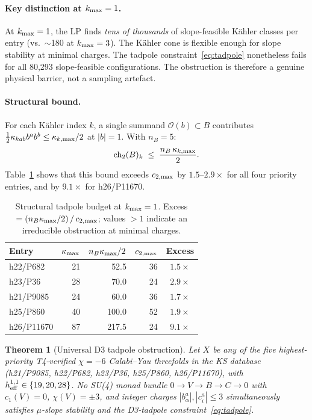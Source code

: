 \documentclass[11pt,a4paper]{article}
\newtheorem{theorem}{Theorem}
\newcommand{\cO}{\mathcal{O}}
\newcommand{\ch}{\mathrm{ch}}
\begin{document}
\paragraph{Key distinction at $k_{\rm max}=1$.}
At $k_{\rm max}=1$, the LP finds \emph{tens of thousands} of
slope-feasible Kähler classes per entry (vs.\ $\sim$180 at $k_{\rm max}=3$).
The Kähler cone is flexible enough for slope stability at minimal charges.
The tadpole constraint~\eqref{eq:tadpole} nonetheless fails for all
80,293 slope-feasible configurations.  The obstruction is therefore
a genuine physical barrier, not a sampling artefact.

\paragraph{Structural bound.}
For each K\"ahler index $k$, a single summand $\cO(b)\subset B$
contributes $\tfrac{1}{2}\kappa_{kab}b^a b^b \leq \kappa_{k,\rm max}/2$
at $|b|=1$.  With $n_B=5$:
\begin{equation}
  \ch_2(B)_k \;\leq\; \frac{n_B\,\kappa_{k,\rm max}}{2}.
  \label{eq:ch2_bound}
\end{equation}
Table~\ref{tab:tadpole_margin} shows that this bound exceeds
$c_{2,\rm max}$ by $1.5$--$2.9\times$ for all four priority entries,
and by $9.1\times$ for h26/P11670.
\begin{table}[h]
\centering
\caption{%
  Structural tadpole budget at $k_{\rm max}=1$.
  Excess $=(n_B\kappa_{\rm max}/2)\,/\,c_{2,\rm max}$;
  values $>1$ indicate an irreducible obstruction at minimal charges.
}
\label{tab:tadpole_margin}
\small
\begin{tabular}{lrrrc}
\toprule
Entry & $\kappa_{\rm max}$ & $n_B\kappa_{\rm max}/2$ & $c_{2,\rm max}$ & Excess \\
\midrule
h22/P682   & 21 &  52.5 & 36 & $1.5\times$ \\
h23/P36    & 28 &  70.0 & 24 & $2.9\times$ \\
h21/P9085  & 24 &  60.0 & 36 & $1.7\times$ \\
h25/P860   & 40 & 100.0 & 52 & $1.9\times$ \\
h26/P11670 & 87 & 217.5 & 24 & $9.1\times$ \\
\bottomrule
\end{tabular}
\end{table}

\begin{theorem}[Universal D3 tadpole obstruction]
\label{thm:no_go}
  Let $X$ be any of the five highest-priority T4-verified
  $\chi=-6$ Calabi--Yau threefolds in the KS database
  (h21/P9085, h22/P682, h23/P36, h25/P860, h26/P11670),
  with $h^{1,1}_{\rm eff}\in\{19,20,28\}$.
  No SU(4) monad bundle $0\to V\to B\to C\to 0$
  with $c_1(V)=0$, $\chi(V)=\pm 3$, and integer charges
  $|b^a_\alpha|,|c^a_i|\leq 3$
  simultaneously satisfies $\mu$-slope stability
  and the D3-tadpole constraint~\eqref{eq:tadpole}.
\end{theorem}
\end{document}
